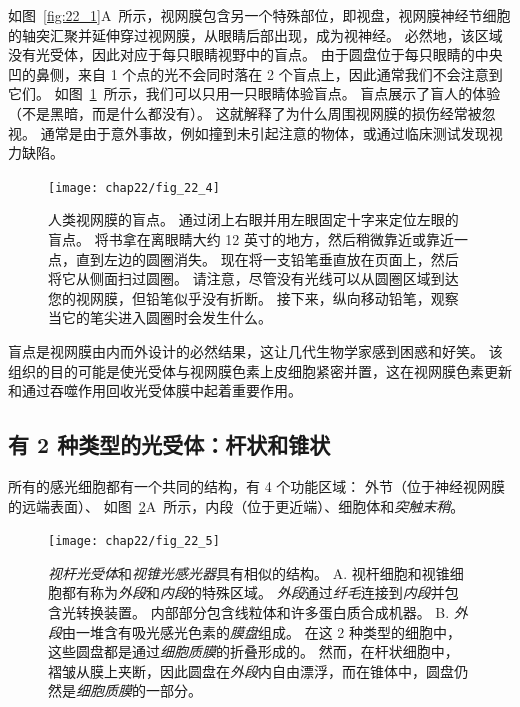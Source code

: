 如图~\ref{fig:22_1}A~所示，视网膜包含另一个特殊部位，即视盘，视网膜神经节细胞的轴突汇聚并延伸穿过视网膜，从眼睛后部出现，成为视神经。
必然地，该区域没有光受体，因此对应于每只眼睛视野中的盲点。
由于圆盘位于每只眼睛的中央凹的鼻侧，来自 1 个点的光不会同时落在 2 个盲点上，因此通常我们不会注意到它们。
如图~\ref{fig:22_4}~所示，我们可以只用一只眼睛体验盲点。
盲点展示了盲人的体验（不是黑暗，而是什么都没有）。
这就解释了为什么周围视网膜的损伤经常被忽视。
通常是由于意外事故，例如撞到未引起注意的物体，或通过临床测试发现视力缺陷。


\begin{figure}[htbp]
	\centering
	\texttt{[image: chap22/fig\_22\_4]}
	\caption{人类视网膜的盲点。
		通过闭上右眼并用左眼固定十字来定位左眼的盲点。
		将书拿在离眼睛大约 12 英寸的地方，然后稍微靠近或靠近一点，直到左边的圆圈消失。 
		现在将一支铅笔垂直放在页面上，然后将它从侧面扫过圆圈。 
		请注意，尽管没有光线可以从圆圈区域到达您的视网膜，但铅笔似乎没有折断。 
		接下来，纵向移动铅笔，观察当它的笔尖进入圆圈时会发生什么\cite{hurvich1981color}。}
	\label{fig:22_4}
\end{figure}


盲点是视网膜由内而外设计的必然结果，这让几代生物学家感到困惑和好笑。
该组织的目的可能是使光受体与视网膜色素上皮细胞紧密并置，这在视网膜色素更新和通过吞噬作用回收光受体膜中起着重要作用。


\subsection{有 2 种类型的光受体：杆状和锥状}

所有的感光细胞都有一个共同的结构，有 4 个功能区域：
外节（位于神经视网膜的远端表面）、
如图~\ref{fig:22_5}A~所示，内段（位于更近端）、细胞体和\textit{突触末稍}。


\begin{figure}[htbp]
	\centering
	\texttt{[image: chap22/fig\_22\_5]}
	\caption{\textit{视杆光受体}和\textit{视锥光感光器}具有相似的结构。
		A. 视杆细胞和视锥细胞都有称为\textit{外段}和\textit{内段}的特殊区域。
		\textit{外段}通过\textit{纤毛}连接到\textit{内段}并包含光转换装置。
		内部部分包含线粒体和许多蛋白质合成机器。
		B. \textit{外段}由一堆含有吸光感光色素的\textit{膜盘}组成。
		在这 2 种类型的细胞中，这些圆盘都是通过\textit{细胞质膜}的折叠形成的。
		然而，在杆状细胞中，褶皱从膜上夹断，因此圆盘在\textit{外段}内自由漂浮，而在锥体中，圆盘仍然是\textit{细胞质膜}的一部分\cite{o1982chemistry,young1970visual}。}
	\label{fig:22_5}
\end{figure}


